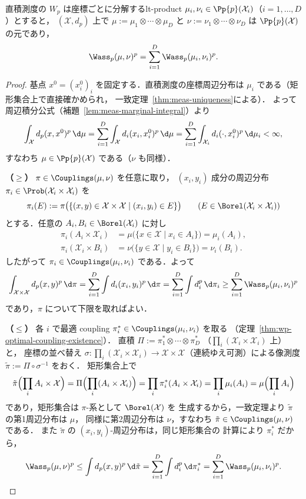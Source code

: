 \begin{theorem}{直積測度の $W_p$ は座標ごとに分解する}{lt-product}
  $\mu_i,\nu_i\in\Pp{p}(\mathcal{X}_i)$（$i=1,\dots,D$）とすると，
  $(\mathcal{X},d_p)$ 上で
  $\mu:=\mu_1\otimes\cdots\otimes\mu_D$ と
  $\nu:=\nu_1\otimes\cdots\otimes\nu_D$ は
  $\Pp{p}(\mathcal{X})$ の元であり，
  \[
    \Wass_p(\mu,\nu)^p=\sum_{i=1}^D\Wass_p(\mu_i,\nu_i)^p.
  \]
\end{theorem}

\begin{proof}
  基点 $x^0=(x^0_i)_i$ を固定する．直積測度の座標周辺分布は
  $\mu_i$ である（矩形集合上で直接確かめられ，
  一致定理~\ref{thm:meas-uniqueness}による）．
  よって周辺積分公式（補題~\ref{lem:meas-marginal-integral}）より
  \[
    \int_{\mathcal{X}}d_p(x,x^0)^p\,\d\mu
    =\sum_{i=1}^D\int_{\mathcal{X}}d_i(x_i,x^0_i)^p\,\d\mu
    =\sum_{i=1}^D\int_{\mathcal{X}_i}d_i(\cdot,x^0_i)^p\,\d\mu_i<\infty,
  \]
  すなわち $\mu\in\Pp{p}(\mathcal{X})$ である（$\nu$ も同様）．

  \textbf{（$\geq$）}
  $\pi\in\Couplings(\mu,\nu)$ を任意に取り，
  $(x_i,y_i)$ 成分の周辺分布
  $\pi_i\in\Prob(\mathcal{X}_i\times\mathcal{X}_i)$ を
  \[
    \pi_i(E)
    :=\pi\bigl(\{(x,y)\in\mathcal{X}\times\mathcal{X}
      \mid (x_i,y_i)\in E\}\bigr)
    \qquad(E\in\Borel(\mathcal{X}_i\times\mathcal{X}_i))
  \]
  とする．任意の $A_i,B_i\in\Borel(\mathcal{X}_i)$ に対し
  \[
    \begin{aligned}
      \pi_i(A_i\times\mathcal{X}_i)
      &=\mu\bigl(\{x\in\mathcal{X}\mid x_i\in A_i\}\bigr)
      =\mu_i(A_i),\\
      \pi_i(\mathcal{X}_i\times B_i)
      &=\nu\bigl(\{y\in\mathcal{X}\mid y_i\in B_i\}\bigr)
      =\nu_i(B_i).
    \end{aligned}
  \]
  したがって $\pi_i\in\Couplings(\mu_i,\nu_i)$ である．よって
  \[
    \int_{\mathcal{X}\times\mathcal{X}}d_p(x,y)^p\,\d\pi
    =\sum_{i=1}^D\int d_i(x_i,y_i)^p\,\d\pi
    =\sum_{i=1}^D\int d_i^p\,\d\pi_i
    \geq\sum_{i=1}^D\Wass_p(\mu_i,\nu_i)^p
  \]
  であり，$\pi$ について下限を取ればよい．

  \textbf{（$\leq$）}
  各 $i$ で最適 coupling
  $\pi_i^*\in\Couplings(\mu_i,\nu_i)$ を取る
  （定理~\ref{thm:wp-optimal-coupling-existence}）．
  直積 $\Pi:=\pi_1^*\otimes\cdots\otimes\pi_D^*$
  （$\prod_i(\mathcal{X}_i\times\mathcal{X}_i)$ 上）と，
  座標の並べ替え
  $\sigma\colon\prod_i(\mathcal{X}_i\times\mathcal{X}_i)
  \to\mathcal{X}\times\mathcal{X}$（連続ゆえ可測）による像測度
  $\tilde\pi:=\Pi\circ\sigma^{-1}$ をおく．
  矩形集合上で
  \[
    \tilde\pi\Bigl(\prod_iA_i\times\mathcal{X}\Bigr)
    =\Pi\Bigl(\prod_i(A_i\times\mathcal{X}_i)\Bigr)
    =\prod_i\pi_i^*(A_i\times\mathcal{X}_i)
    =\prod_i\mu_i(A_i)
    =\mu\Bigl(\prod_iA_i\Bigr)
  \]
  であり，矩形集合は $\pi$-系として $\Borel(\mathcal{X})$ を
  生成するから，一致定理より $\tilde\pi$ の第1周辺分布は $\mu$，
  同様に第2周辺分布は $\nu$，すなわち
  $\tilde\pi\in\Couplings(\mu,\nu)$ である．
  また $\tilde\pi$ の $(x_i,y_i)$-周辺分布は，同じ矩形集合の
  計算により $\pi_i^*$ だから，
  \[
    \Wass_p(\mu,\nu)^p
    \leq\int d_p(x,y)^p\,\d\tilde\pi
    =\sum_{i=1}^D\int d_i^p\,\d\pi_i^*
    =\sum_{i=1}^D\Wass_p(\mu_i,\nu_i)^p.  \qedhere
  \]
\end{proof}

